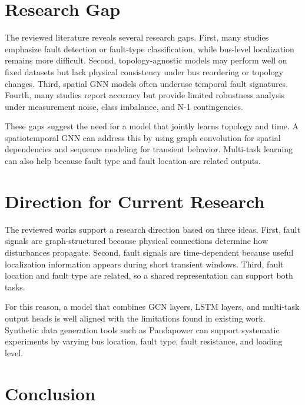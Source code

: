 \documentclass[12pt,a4paper]{article}
\begin{document}
\section{Research Gap}

The reviewed literature reveals several research gaps. First, many studies emphasize fault detection or fault-type classification, while bus-level localization remains more difficult. Second, topology-agnostic models may perform well on fixed datasets but lack physical consistency under bus reordering or topology changes. Third, spatial GNN models often underuse temporal fault signatures. Fourth, many studies report accuracy but provide limited robustness analysis under measurement noise, class imbalance, and N-1 contingencies.

These gaps suggest the need for a model that jointly learns topology and time. A spatiotemporal GNN can address this by using graph convolution for spatial dependencies and sequence modeling for transient behavior. Multi-task learning can also help because fault type and fault location are related outputs.

\section{Direction for Current Research}

The reviewed works support a research direction based on three ideas. First, fault signals are graph-structured because physical connections determine how disturbances propagate. Second, fault signals are time-dependent because useful localization information appears during short transient windows. Third, fault location and fault type are related, so a shared representation can support both tasks.

For this reason, a model that combines GCN layers, LSTM layers, and multi-task output heads is well aligned with the limitations found in existing work. Synthetic data generation tools such as Pandapower \cite{thurner2018} can support systematic experiments by varying bus location, fault type, fault resistance, and loading level.

\section{Conclusion}
\end{document}
